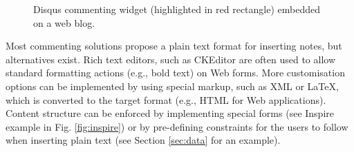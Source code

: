 \begin{figure}[!ht]
  \centering
  \caption[Disqus commenting widget embedded on a web blog]
          {Disqus commenting widget (highlighted in red rectangle) embedded on a web blog.}
  \label{fig:disqus}
\end{figure}

Most commenting solutions propose a plain text format for inserting notes,
but alternatives exist. Rich text editors, such as CKEditor \cite{ref:cked} are
often used to allow standard formatting actions (e.g., bold text) on Web forms.
More customisation options can be implemented by using special markup, such as
XML or LaTeX, which is converted to the target format (e.g., HTML for Web
applications). Content structure can be enforced by implementing special forms
(see Inspire example in Fig. \ref{fig:inspire}) or by pre-defining constraints
for the users to follow when inserting plain text (see Section \ref{sec:data}
for an example).

